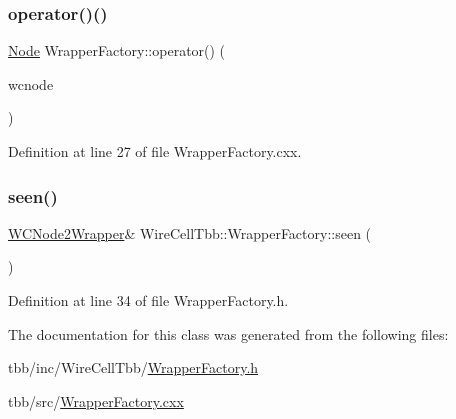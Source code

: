 \subsubsection{\texorpdfstring{operator()()}{operator()()}}
{\footnotesize\ttfamily \hyperlink{namespace_wire_cell_tbb_aa7b6ff37a20e0174babf0614286bb59f}{Node} Wrapper\+Factory\+::operator() (\begin{DoxyParamCaption}\item[{\hyperlink{class_wire_cell_1_1_interface_a09c548fb8266cfa39afb2e74a4615c37}{Wire\+Cell\+::\+I\+Node\+::pointer}}]{wcnode }\end{DoxyParamCaption})}



Definition at line 27 of file Wrapper\+Factory.\+cxx.

\mbox{\label{class_wire_cell_tbb_1_1_wrapper_factory_a66d71776bf06829f1e2a76a5f386935c}} 
\subsubsection{\texorpdfstring{seen()}{seen()}}
{\footnotesize\ttfamily \hyperlink{class_wire_cell_tbb_1_1_wrapper_factory_abb90529b755ae886470769d8c46dc041}{W\+C\+Node2\+Wrapper}\& Wire\+Cell\+Tbb\+::\+Wrapper\+Factory\+::seen (\begin{DoxyParamCaption}{ }\end{DoxyParamCaption})\hspace{0.3cm}{\ttfamily [inline]}}



Definition at line 34 of file Wrapper\+Factory.\+h.



The documentation for this class was generated from the following files\+:\begin{DoxyCompactItemize}
\item 
tbb/inc/\+Wire\+Cell\+Tbb/\hyperlink{_wrapper_factory_8h}{Wrapper\+Factory.\+h}\item 
tbb/src/\hyperlink{_wrapper_factory_8cxx}{Wrapper\+Factory.\+cxx}\end{DoxyCompactItemize}
